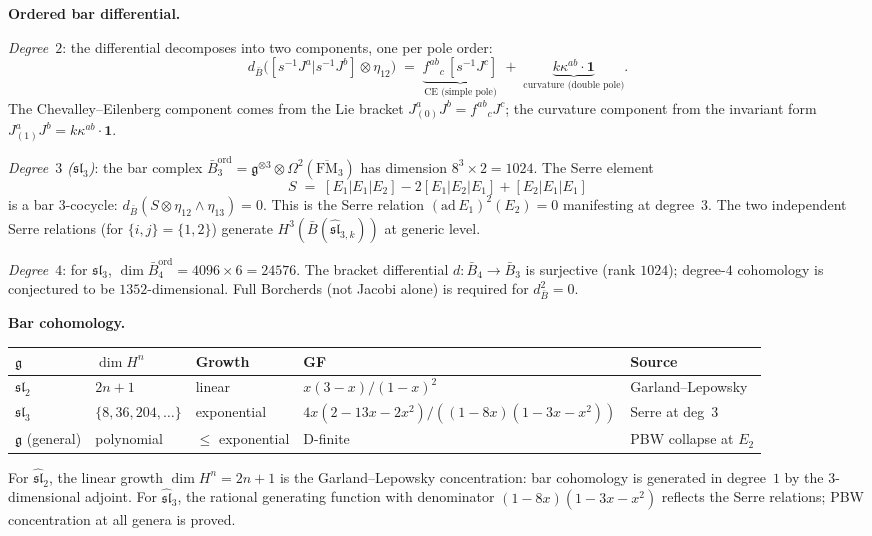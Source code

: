 \documentclass[11pt,reqno]{amsart}
\theoremstyle{definition}
\theoremstyle{remark}
\providecommand{\barB}{\bar{B}}
\providecommand{\fg}{\mathfrak{g}}
\numberwithin{equation}{section}
\begin{document}
\medskip\noindent\textbf{Ordered bar differential.}\enspace

\emph{Degree~$2$}: the differential decomposes into two components,
one per pole order:
\[
d_{\barB}\bigl([s^{-1}J^a|s^{-1}J^b]\otimes\eta_{12}\bigr)
\;=\;
\underbrace{f^{ab}{}_{c}\,[s^{-1}J^c]}_{\text{CE (simple pole)}}
\;+\;
\underbrace{k\kappa^{ab}\cdot\mathbf{1}}_{\text{curvature (double pole)}}.
\]
The Chevalley--Eilenberg component comes from the Lie bracket
$J^a_{(0)}J^b=f^{ab}{}_cJ^c$; the curvature component from the
invariant form $J^a_{(1)}J^b=k\kappa^{ab}\cdot\mathbf{1}$.

\emph{Degree~$3$ ($\mathfrak{sl}_3$)}: the bar complex
$\barB^{\mathrm{ord}}_3=\fg^{\otimes 3}
\otimes\Omega^2(\overline{\mathrm{FM}}_3)$ has dimension
$8^3\times 2=1024$. The Serre element
\[
S\;=\;[E_1|E_1|E_2]-2[E_1|E_2|E_1]+[E_2|E_1|E_1]
\]
is a bar $3$-cocycle: $d_{\barB}(S\otimes\eta_{12}\wedge\eta_{13})=0$.
This is the Serre relation $(\mathrm{ad}\,E_1)^2(E_2)=0$
manifesting at degree~$3$. The two independent Serre
relations (for $\{i,j\}=\{1,2\}$) generate
$H^3(\barB(\widehat{\mathfrak{sl}}_{3,k}))$ at generic level.

\emph{Degree~$4$}: for $\mathfrak{sl}_3$,
$\dim\barB^{\mathrm{ord}}_4=4096\times 6=24576$.
The bracket differential $d\colon\barB_4\to\barB_3$ is surjective
(rank $1024$); degree-$4$ cohomology is conjectured to be
$1352$-dimensional. Full Borcherds (not Jacobi alone) is required
for $d_{\barB}^2=0$.

\medskip\noindent\textbf{Bar cohomology.}\enspace
\begin{center}
\small
\renewcommand{\arraystretch}{1.15}
\begin{tabular}{lllll}
$\fg$ & $\dim H^n$ & Growth & GF & Source\\ \hline
$\mathfrak{sl}_2$ & $2n+1$ & linear & $x(3{-}x)/(1{-}x)^{2}$
 & Garland--Lepowsky\\
$\mathfrak{sl}_3$ & $\{8,36,204,\ldots\}$ & exponential
 & $4x(2{-}13x{-}2x^2)/((1{-}8x)(1{-}3x{-}x^2))$ & Serre at deg~$3$\\
$\fg$ (general) & polynomial & $\le$ exponential & D-finite
 & PBW collapse at $E_2$
\end{tabular}
\end{center}
For $\widehat{\mathfrak{sl}}_2$, the linear growth $\dim H^n=2n+1$
is the Garland--Lepowsky concentration: bar cohomology is generated
in degree~$1$ by the $3$-dimensional adjoint. For
$\widehat{\mathfrak{sl}}_3$, the rational generating function with
denominator $(1-8x)(1-3x-x^2)$ reflects the Serre relations; PBW
concentration at all genera is proved.
\end{document}
